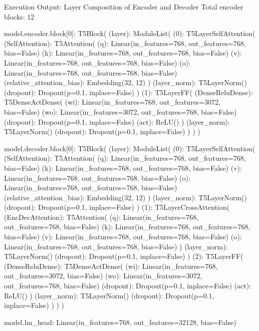 \documentclass[11pt,a4paper]{article}
\begin{document}
\begin{macterminal}{Execution Output: Layer Composition of Encoder and Decoder}
Total encoder blocks: 12

model.encoder.block[0]:
T5Block(
  (layer): ModuleList(
    (0): T5LayerSelfAttention(
      (SelfAttention): T5Attention(
        (q): Linear(in_features=768, out_features=768, bias=False)
        (k): Linear(in_features=768, out_features=768, bias=False)
        (v): Linear(in_features=768, out_features=768, bias=False)
        (o): Linear(in_features=768, out_features=768, bias=False)
        (relative_attention_bias): Embedding(32, 12)
      )
      (layer_norm): T5LayerNorm()
      (dropout): Dropout(p=0.1, inplace=False)
    )
    (1): T5LayerFF(
      (DenseReluDense): T5DenseActDense(
        (wi): Linear(in_features=768, out_features=3072, bias=False)
        (wo): Linear(in_features=3072, out_features=768, bias=False)
        (dropout): Dropout(p=0.1, inplace=False)
        (act): ReLU()
      )
      (layer_norm): T5LayerNorm()
      (dropout): Dropout(p=0.1, inplace=False)
    )
  )
)

model.decoder.block[0]:
T5Block(
  (layer): ModuleList(
    (0): T5LayerSelfAttention(
      (SelfAttention): T5Attention(
        (q): Linear(in_features=768, out_features=768, bias=False)
        (k): Linear(in_features=768, out_features=768, bias=False)
        (v): Linear(in_features=768, out_features=768, bias=False)
        (o): Linear(in_features=768, out_features=768, bias=False)
        (relative_attention_bias): Embedding(32, 12)
      )
      (layer_norm): T5LayerNorm()
      (dropout): Dropout(p=0.1, inplace=False)
    )
    (1): T5LayerCrossAttention(
      (EncDecAttention): T5Attention(
        (q): Linear(in_features=768, out_features=768, bias=False)
        (k): Linear(in_features=768, out_features=768, bias=False)
        (v): Linear(in_features=768, out_features=768, bias=False)
        (o): Linear(in_features=768, out_features=768, bias=False)
      )
      (layer_norm): T5LayerNorm()
      (dropout): Dropout(p=0.1, inplace=False)
    )
    (2): T5LayerFF(
      (DenseReluDense): T5DenseActDense(
        (wi): Linear(in_features=768, out_features=3072, bias=False)
        (wo): Linear(in_features=3072, out_features=768, bias=False)
        (dropout): Dropout(p=0.1, inplace=False)
        (act): ReLU()
      )
      (layer_norm): T5LayerNorm()
      (dropout): Dropout(p=0.1, inplace=False)
    )
  )
)

model.lm_head:
Linear(in_features=768, out_features=32128, bias=False)
\end{macterminal}
\end{document}

